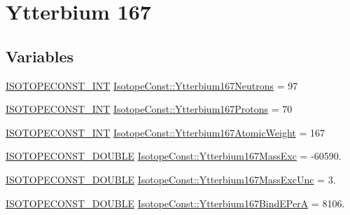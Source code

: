 \hypertarget{group___isotope_const-_ytterbium-_yb167}{}\section{Ytterbium 167}
\label{group___isotope_const-_ytterbium-_yb167}
\subsection*{Variables}
\begin{DoxyCompactItemize}
\item 
\mbox{\hyperlink{group___isotope_const-_macros_ga5f18360b3e99483a35c32d789e62621c}{I\+S\+O\+T\+O\+P\+E\+C\+O\+N\+S\+T\+\_\+\+I\+NT}} \mbox{\hyperlink{group___isotope_const-_ytterbium-_yb167_ga2ce57c9be57771126f4f1aa5e88ab78b}{Isotope\+Const\+::\+Ytterbium167\+Neutrons}} = 97
\item 
\mbox{\hyperlink{group___isotope_const-_macros_ga5f18360b3e99483a35c32d789e62621c}{I\+S\+O\+T\+O\+P\+E\+C\+O\+N\+S\+T\+\_\+\+I\+NT}} \mbox{\hyperlink{group___isotope_const-_ytterbium-_yb167_ga77b029f855b1bfeb8c0150441929f47a}{Isotope\+Const\+::\+Ytterbium167\+Protons}} = 70
\item 
\mbox{\hyperlink{group___isotope_const-_macros_ga5f18360b3e99483a35c32d789e62621c}{I\+S\+O\+T\+O\+P\+E\+C\+O\+N\+S\+T\+\_\+\+I\+NT}} \mbox{\hyperlink{group___isotope_const-_ytterbium-_yb167_ga4095b1a674c515d4c2a08d151e315f1d}{Isotope\+Const\+::\+Ytterbium167\+Atomic\+Weight}} = 167
\item 
\mbox{\hyperlink{group___isotope_const-_macros_ga8f45a7272ce02c0b4c65c44636ed719a}{I\+S\+O\+T\+O\+P\+E\+C\+O\+N\+S\+T\+\_\+\+D\+O\+U\+B\+LE}} \mbox{\hyperlink{group___isotope_const-_ytterbium-_yb167_gaa666070d349bf7182b87248944cecaee}{Isotope\+Const\+::\+Ytterbium167\+Mass\+Exc}} = -\/60590.
\item 
\mbox{\hyperlink{group___isotope_const-_macros_ga8f45a7272ce02c0b4c65c44636ed719a}{I\+S\+O\+T\+O\+P\+E\+C\+O\+N\+S\+T\+\_\+\+D\+O\+U\+B\+LE}} \mbox{\hyperlink{group___isotope_const-_ytterbium-_yb167_gab6dfe50001ebcd05ef691e661cdf898f}{Isotope\+Const\+::\+Ytterbium167\+Mass\+Exc\+Unc}} = 3.
\item 
\mbox{\hyperlink{group___isotope_const-_macros_ga8f45a7272ce02c0b4c65c44636ed719a}{I\+S\+O\+T\+O\+P\+E\+C\+O\+N\+S\+T\+\_\+\+D\+O\+U\+B\+LE}} \mbox{\hyperlink{group___isotope_const-_ytterbium-_yb167_ga17d9e1f251220f32e4850c9ed201dda5}{Isotope\+Const\+::\+Ytterbium167\+Bind\+E\+PerA}} = 8106.
\item 

\end{DoxyCompactItemize}
